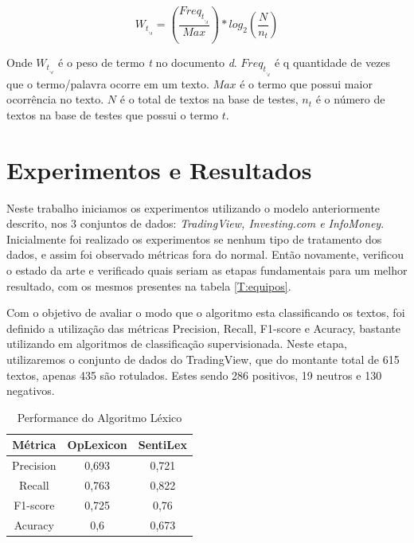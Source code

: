 \documentclass[conference]{IEEEtran}
\begin{document}
\begin{equation*}
    W_t_,_d = \left ( \frac{Freq_t_,_d}{Max} \right ) * log_2 \left ( \frac{N}{n_t} \right)
\end{equation*}

Onde \( W_t_,_d \) é o peso de termo \textit{t} no documento \textit{d}. \( Freq_t_,_d \) é q quantidade de vezes que o termo/palavra ocorre em um texto. \( Max \) é o termo que possui maior ocorrência no texto. \( N \) é o total de textos na base de testes, \( n_t \) é o número de textos na base de testes que possui o termo \( t \).

\section{Experimentos e Resultados}

Neste trabalho iniciamos os experimentos utilizando o modelo anteriormente descrito, nos 3 conjuntos de dados: \textit{TradingView, Investing.com e InfoMoney}. Inicialmente foi realizado os experimentos se nenhum tipo de tratamento dos dados, e assim foi observado métricas fora do normal. Então novamente, verificou o estado da arte e verificado quais seriam as etapas fundamentais para um melhor resultado, com os mesmos presentes na tabela \ref{T:equipos}. 

Com o objetivo de avaliar o modo que o algoritmo esta classificando os textos, foi definido a utilização das métricas Precision, Recall, F1-score e Acuracy, bastante utilizando em algoritmos de classificação supervisionada. Neste etapa, utilizaremos o conjunto de dados do TradingView, que do montante total de 615 textos, apenas 435 são rotulados. Estes sendo 286 positivos, 19 neutros e 130 negativos. 

\begin{table}[H]
    \caption{Performance do Algoritmo Léxico} \label{tab:perf} 
    \centering
    \begin{tabular}{|c|c|c|}
    \hline
    Métrica & OpLexicon & SentiLex \\ \hline
    Precision & 0,693 & 0,721 \\ 
    Recall & 0,763 & 0,822 \\ 
    F1-score & 0,725 & 0,76 \\ 
    Acuracy & 0,6 & 0,673 \\ \hline
    \end{tabular}
\end{table}
\end{document}
